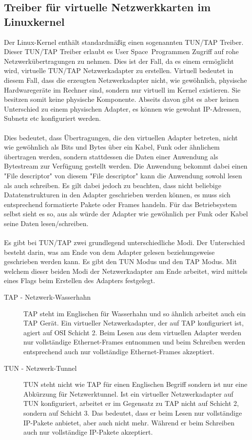 \subsection{Treiber für virtuelle Netzwerkkarten im Linuxkernel}
Der Linux-Kernel enthält standardmäßig einen sogenannten TUN/TAP Treiber. Dieser TUN/TAP Treiber erlaubt es \dq User Space\dq \ Programmen Zugriff auf rohe Netzwerkübertragungen zu nehmen. Dies ist der Fall, da es einem ermöglicht wird, virtuelle TUN/TAP Netzwerkadapter zu erstellen.
Virtuell bedeutet in diesem Fall, dass die erzeugten Netzwerkadapter nicht, wie gewöhnlich, physische Hardwaregeräte im Rechner sind, sondern nur virtuell im Kernel existieren. Sie besitzen somit keine physische Komponente. Abseits davon gibt es aber keinen Unterschied zu einem physischen Adapter, es können wie gewohnt IP-Adressen, Subnetz etc konfiguriert werden.
\\\\
Dies bedeutet, dass Übertragungen, die den virtuellen Adapter betreten, nicht wie gewöhnlich als Bits und Bytes über ein Kabel, Funk oder ähnlichem übertragen werden, sondern stattdessen die Daten einer Anwendung als Bytestream zur Verfügung gestellt werden. Die Anwendung bekommt dabei einen "File descriptor" von diesem "File descriptor" kann die Anwendung sowohl lesen als auch schreiben. Es gilt dabei jedoch zu beachten, dass nicht beliebige Datatenstrukturen in den Adapter geschrieben werden können, es muss sich entsprechend formatierte Pakete oder Frames handeln. Für das Betriebsystem selbst sieht es so, aus als würde der Adapter wie gewöhnlich per Funk oder Kabel seine Daten lesen/schreiben.
\\\\
Es gibt bei TUN/TAP zwei grundlegend unterschiedliche Modi. Der Unterschied besteht darin, was am Ende von dem Adapter gelesen beziehungsweise geschrieben werden kann. Es gibt den TUN Modus und den TAP Modus. Mit welchem dieser beiden Modi der Netzwerkadapter am Ende arbeitet, wird mittels eines Flags beim Erstellen des Adapters festgelegt.
\\
\begin{description}
    \item[TAP - Netzwerk-Wasserhahn] TAP steht im Englischen für Wasserhahn und so ähnlich arbeitet auch ein TAP Gerät.
    Ein virtueller Netzwerkadapter, der auf TAP konfiguriert ist, agiert auf OSI Schicht 2. 
    Beim Lesen aus dem virtuellen Adapter werden nur vollständige Ethernet-Frames entnommen und beim Schreiben werden entsprechend auch nur vollständige Ethernet-Frames akzeptiert.
    \\
    \item[TUN - Netzwerk-Tunnel] TUN steht nicht wie TAP für einen Englischen Begriff sondern ist nur eine Abkürzung für Netzwerktunnel. 
    Ist ein virtueller Netzwerkadapter auf TUN konfiguriert, arbeitet er im Gegensatz zu TAP nicht auf Schicht 2, sondern auf Schicht 3. Das bedeutet, dass er beim Lesen nur vollständige IP-Pakete anbietet, aber auch nicht mehr. Während er beim Schreiben auch nur vollständige IP-Pakete akzeptiert. 
\end{description}
\

